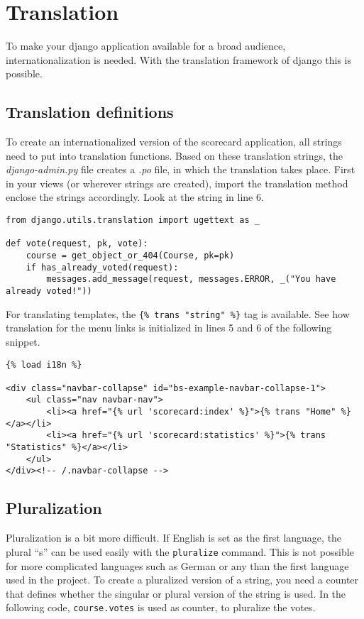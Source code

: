 \section{Translation}

To make your django application available for a broad audience, internationalization is needed. With the translation framework of django this is possible.

\subsection{Translation definitions}
To create an internationalized version of the scorecard application, all strings need to put into translation functions. Based on these translation strings, the \emph{django-admin.py} file creates a \emph{.po} file, in which the translation takes place. First in your views (or wherever strings are created), import the translation method enclose the strings accordingly. Look at the string in line 6.

\begin{lstlisting}[style=Python, caption=exceprt of views.py with translation, label=lst:views.py_translation]
from django.utils.translation import ugettext as _

def vote(request, pk, vote):
    course = get_object_or_404(Course, pk=pk)
    if has_already_voted(request):
        messages.add_message(request, messages.ERROR, _("You have already voted!"))
\end{lstlisting}

For translating templates, the \lstinline|{% trans "string" %}| tag is available. See how translation for the menu links is initialized in lines 5 and 6 of the following snippet.

\begin{lstlisting}[style=HTML, caption=exceprt of base.html with translation, label=lst:base.html_translation]
{% load i18n %}

<div class="navbar-collapse" id="bs-example-navbar-collapse-1">
    <ul class="nav navbar-nav">
        <li><a href="{% url 'scorecard:index' %}">{% trans "Home" %}</a></li>
        <li><a href="{% url 'scorecard:statistics' %}">{% trans "Statistics" %}</a></li>
    </ul>
</div><!-- /.navbar-collapse -->
\end{lstlisting}

\subsection{Pluralization}
Pluralization is a bit more difficult. If English is set as the first language, the plural ``s'' can be used easily with the \lstinline|pluralize| command. This is not possible for more complicated languages such as German or any than the first language used in the project. To create a pluralized version of a string, you need a counter that defines whether the singular or plural version of the string is used. In the following code, \lstinline|course.votes| is used as counter, to pluralize the votes.

